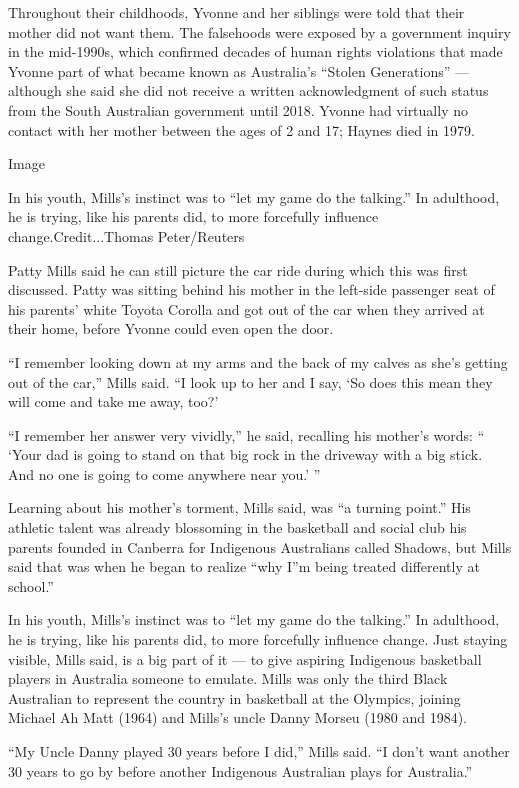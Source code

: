 Throughout their childhoods, Yvonne and her siblings were told that
their mother did not want them. The falsehoods were exposed by a
government inquiry in the mid-1990s, which confirmed decades of human
rights violations that made Yvonne part of what became known as
Australia's ``Stolen Generations'' --- although she said she did not
receive a written acknowledgment of such status from the South
Australian government until 2018. Yvonne had virtually no contact with
her mother between the ages of 2 and 17; Haynes died in 1979.

Image

In his youth, Mills's instinct was to ``let my game do the talking.'' In
adulthood, he is trying, like his parents did, to more forcefully
influence change.Credit...Thomas Peter/Reuters

Patty Mills said he can still picture the car ride during which this was
first discussed. Patty was sitting behind his mother in the left-side
passenger seat of his parents' white Toyota Corolla and got out of the
car when they arrived at their home, before Yvonne could even open the
door.

``I remember looking down at my arms and the back of my calves as she's
getting out of the car,'' Mills said. ``I look up to her and I say, `So
does this mean they will come and take me away, too?'

``I remember her answer very vividly,'' he said, recalling his mother's
words: `` `Your dad is going to stand on that big rock in the driveway
with a big stick. And no one is going to come anywhere near you.' ''

Learning about his mother's torment, Mills said, was ``a turning
point.'' His athletic talent was already blossoming in the basketball
and social club his parents founded in Canberra for Indigenous
Australians called Shadows, but Mills said that was when he began to
realize ``why I''m being treated differently at school.''

In his youth, Mills's instinct was to ``let my game do the talking.'' In
adulthood, he is trying, like his parents did, to more forcefully
influence change. Just staying visible, Mills said, is a big part of it
--- to give aspiring Indigenous basketball players in Australia someone
to emulate. Mills was only the third Black Australian to represent the
country in basketball at the Olympics, joining Michael Ah Matt (1964)
and Mills's uncle Danny Morseu (1980 and 1984).

``My Uncle Danny played 30 years before I did,'' Mills said. ``I don't
want another 30 years to go by before another Indigenous Australian
plays for Australia.''


